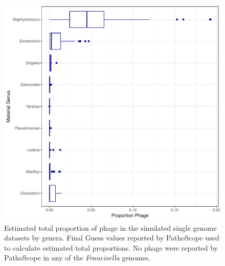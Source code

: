 \documentclass[fleqn,10pt,lineno]{wlpeerj}\usepackage[]{graphicx}\usepackage[]{color}
\makeatletter
\def\maxwidth{ %
  \ifdim\Gin@nat@width>\linewidth
    \linewidth
  \else
    \Gin@nat@width
  \fi
}
\newenvironment{knitrout}{}{} %
\makeatother
\begin{document}
\begin{knitrout}
\color{fgcolor}\begin{figure}
\includegraphics[width=\maxwidth]{figure/phage_prop-1} \caption[Estimated total proportion of phage in the simulated single genome datasets by genera]{Estimated total proportion of phage in the simulated single genome datasets by genera. Final Guess values reported by PathoScope used to calculate estimated total proportions. No phage were reported by PathoScope in any of the \textit{Francisella} genomes.}\label{fig:phage_prop}
\end{figure}


\end{knitrout}
\end{document}
